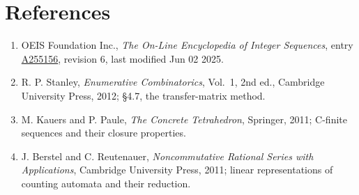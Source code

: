 \documentclass[11pt]{article}
\theoremstyle{definition}
\begin{document}
\section{References}

\begin{enumerate}

\item OEIS Foundation Inc., \emph{The On-Line Encyclopedia of Integer Sequences}, entry \href{https://oeis.org/A255156}{A255156}, revision 6, last modified Jun 02 2025.

\item R. P. Stanley, \emph{Enumerative Combinatorics}, Vol.~1, 2nd ed., Cambridge University Press, 2012; \S4.7, the transfer-matrix method.

\item M. Kauers and P. Paule, \emph{The Concrete Tetrahedron}, Springer, 2011; C-finite sequences and their closure properties.

\item J. Berstel and C. Reutenauer, \emph{Noncommutative Rational Series with Applications}, Cambridge University Press, 2011; linear representations of counting automata and their reduction.

\end{enumerate}
\end{document}
